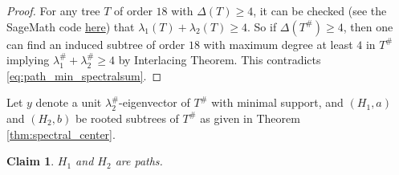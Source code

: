 \documentclass[11pt]{article}
\theoremstyle{plain}
\newtheorem{claim}{Claim}[section]
\numberwithin{equation}{section}
\begin{document}
\begin{proof}
    For any tree $T$ of order $18$ with $\Delta(T)\ge 4$, it can be checked (see the SageMath code \href{https://github.com/Shivaramkratos/Codes_misc/blob/main/convex_sum_specific_check.sage}{here}) that $\lambda_1(T)+\lambda_2(T)\ge 4$. So if $\Delta(T^{\#})\ge 4$, then one can find an induced subtree of order $18$ with maximum degree at least $4$ in $T^{\#}$ implying $\lambda_1^{\#}+\lambda_2^{\#}\ge 4$ by Interlacing Theorem. This contradicts \eqref{eq:path_min_spectralsum}.
\end{proof}

Let $y$ denote a unit $\lambda_2^{\#}$-eigenvector of $T^{\#}$ with minimal support, and $(H_1,a)$ and $(H_2,b)$ be rooted subtrees of $T^{\#}$ as given in Theorem \ref{thm:spectral_center}. 

\begin{claim}\label{claim:H_i_is_a_path}
    $H_1$ and $H_2$ are paths.
\end{claim}
\end{document}
